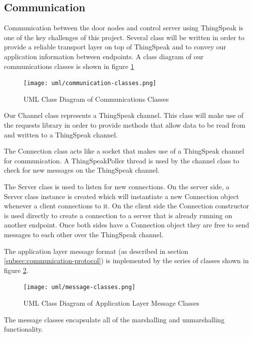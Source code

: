 \subsection{Communication}
\label{subsec:communication-software}

Communication between the door nodes and control server using ThingSpeak is one
of the key challenges of this project. Several class will be written in order to
provide a reliable transport layer on top of ThingSpeak and to convey our
application information between endpoints. A class diagram of our communications
classes is shown in figure \ref{fig:communication-classes}

\begin{figure}[!htb]
\centering
\texttt{[image: uml/communication-classes.png]}
\caption{UML Class Diagram of Communications Classes}
\label{fig:communication-classes}
\end{figure}

Our Channel class represents a ThingSpeak channel. This class will make use of
the requests library in order to provide methods that allow data to be read
from and written to a ThingSpeak channel.

The Connection class acts like a socket that makes use of a ThingSpeak channel
for communication. A ThingSpeakPoller thread is used by the channel class to
check for new messages on the ThingSpeak channel.

The Server class is used to listen for new connections. On the server side, a
Server class instance is created which will instantiate a new Connection object
whenever a client connections to it. On the client side the Connection
constructor is used directly to create a connection to a server that is already
running on another endpoint. Once both sides have a Connection object they are
free to send messages to each other over the ThingSpeak channel.

The application layer message format (as described in section
\ref{subsec:communication-protocol}) is implemented by the series of classes
shown in figure \ref{fig:message-classes}.

\begin{figure}[!htb]
\centering
\texttt{[image: uml/message-classes.png]}
\caption{UML Class Diagram of Application Layer Message Classes}
\label{fig:message-classes}
\end{figure}

The message classes encapsulate all of the marshalling and unmarshalling
functionality.

